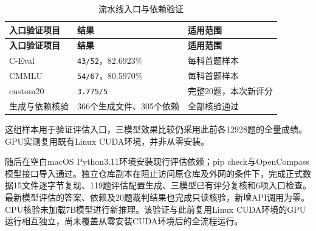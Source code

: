 \documentclass[UTF8,fontset=fandol,a4paper,11pt]{ctexart}
\begin{document}
\Needspace{135pt}

\begin{longtable}[]{@{}
  >{\raggedright\arraybackslash}p{}
  >{\raggedleft\arraybackslash}p{}
  >{\raggedright\arraybackslash}p{}@{}}
\caption{流水线入口与依赖验证}\tabularnewline
\toprule\noalign{}
\begin{minipage}[b]{\linewidth}\raggedright
\textbf{入口验证项目}
\end{minipage} & \begin{minipage}[b]{\linewidth}\raggedleft
\textbf{结果}
\end{minipage} & \begin{minipage}[b]{\linewidth}\raggedright
\textbf{适用范围}
\end{minipage} \\
\midrule\noalign{}
\endfirsthead
\toprule\noalign{}
\begin{minipage}[b]{\linewidth}\raggedright
\textbf{入口验证项目}
\end{minipage} & \begin{minipage}[b]{\linewidth}\raggedleft
\textbf{结果}
\end{minipage} & \begin{minipage}[b]{\linewidth}\raggedright
\textbf{适用范围}
\end{minipage} \\
\midrule\noalign{}
\endhead
\bottomrule\noalign{}
\endlastfoot
C-Eval & {\nolinkurl{43/52}，82.6923\%} & 每科首题样本 \\
CMMLU & {\nolinkurl{54/67}，80.5970\%} & 每科首题样本 \\
custom20 & {\nolinkurl{3.775/5}} & 完整20题，本次新评分 \\
生成与依赖核验 & 366个生成文件、305个依赖 & 全部核验通过 \\
\end{longtable}

这组样本用于验证评估入口，三模型效果比较仍采用此前各12928题的全量成绩。GPU实测复用既有Linux
CUDA环境，并非从零安装。

随后在空白macOS Python3.11环境安装现行评估依赖；pip
check与OpenCompass模型接口导入通过。独立仓库副本在阻止访问原仓库及外网的条件下，完成正式数据15文件逐字节复现、119题评估配置生成、三模型已有评分复核和6项入口检查。最新模型评估的答案、依赖及20题裁判结果也完成只读核验，新增API调用为零。CPU核验未加载7B模型进行新推理。该验证与此前复用Linux
CUDA环境的GPU运行相互独立，尚未覆盖从零安装CUDA环境后的全流程运行。
\end{document}
